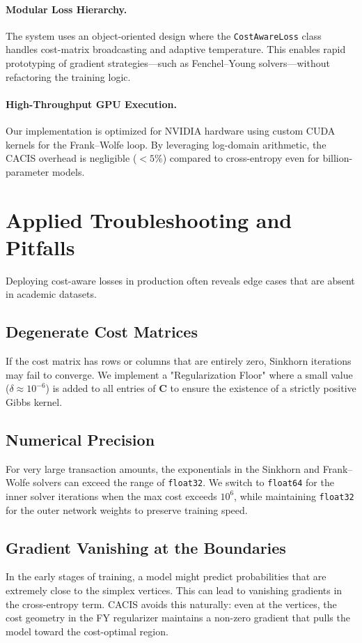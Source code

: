 \documentclass[sigconf,anonymous]{acmart}
\newcommand{\CACIS}{\textsc{CACIS}}
\newcommand{\mC}{\mathbf{C}}
\begin{document}
\paragraph{Modular Loss Hierarchy.} The system uses an object-oriented design where the \texttt{CostAwareLoss} class handles cost-matrix broadcasting and adaptive temperature. This enables rapid prototyping of gradient strategies—such as Fenchel--Young solvers—without refactoring the training logic.

\paragraph{High-Throughput GPU Execution.} Our implementation is optimized for NVIDIA hardware using custom CUDA kernels for the Frank--Wolfe loop. By leveraging log-domain arithmetic, the \CACIS{} overhead is negligible ($<5\%$) compared to cross-entropy even for billion-parameter models.

\section{Applied Troubleshooting and Pitfalls}
\label{sec:troubleshooting}

Deploying cost-aware losses in production often reveals edge cases that are absent in academic datasets.

\subsection{Degenerate Cost Matrices}
If the cost matrix has rows or columns that are entirely zero, Sinkhorn iterations may fail to converge. We implement a "Regularization Floor" where a small value ($\delta \approx 10^{-6}$) is added to all entries of $\mC$ to ensure the existence of a strictly positive Gibbs kernel.

\subsection{Numerical Precision}
For very large transaction amounts, the exponentials in the Sinkhorn and Frank--Wolfe solvers can exceed the range of \texttt{float32}. We switch to \texttt{float64} for the inner solver iterations when the max cost exceeds $10^{6}$, while maintaining \texttt{float32} for the outer network weights to preserve training speed.

\subsection{Gradient Vanishing at the Boundaries}
In the early stages of training, a model might predict probabilities that are extremely close to the simplex vertices. This can lead to vanishing gradients in the cross-entropy term. \CACIS{} avoids this naturally: even at the vertices, the cost geometry in the FY regularizer maintains a non-zero gradient that pulls the model toward the cost-optimal region.
\end{document}
